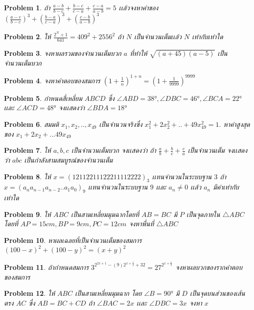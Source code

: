 \documentclass[a4paper,12pt]{article}
\newtheorem{problem}{Problem}
\begin{document}
	\begin{problem}
		ถ้า $\frac{a-b}{b-c}+\frac{b-c}{c-a}+\frac{c-a}{a-b} = 5$ เเล้วจงหาค่าของ $(\frac{a-c}{b-c})^3+(\frac{b-a}{c-a})^3+(\frac{c-b}{a-b})^3$
	\end{problem}
	\begin{problem}
		ให้ $\frac{2^N+1}{641} = 409^2 +2556^2$ ถ้า $N$ เป็นจำนวนเต็มเเล้ว $N$ เท่ากับเท่าใด
	\end{problem}
	\begin{problem}
		จงหาผลรวมของจำนวนเต็มบวก $a$ ที่ทำให้ $\sqrt{(a+45)(a-5)}$ เป็นจำนวนเต็มบวก
	\end{problem}
	\begin{problem}
		จงหาคำตอบของสมการ $(1+\frac{1}{n})^{1+n} = (1+\frac{1}{9999})^{9999}$
	\end{problem}
	\begin{problem}
		กำหนดสี่เหลี่ยม $ABCD$ ซึ่ง $\angle{ABD} = \ang{38}, \angle{DBC} = \ang{46}, \angle{BCA} = \ang{22}$ เเละ $\angle{ACD} = \ang{48}$ จงเเสดงว่า $\angle{BDA} = \ang{18}$ 
	\end{problem}
	\begin{problem}
		สมมติ $x_1,x_2,..,x_49$ เป็นจำนวนจริงซึ่ง $x_1^2+2x_2^2+..+49x_{49}^2 = 1.$ หาค่าสูงสุดของ $x_1+2x_2+...49x_{49}$
	\end{problem}
	\begin{problem}
		ให้ $a,b,c$ เป็นจำนวนเต็มบวก จงเเสดงว่า ถ้า $\frac{a}{b}+\frac{b}{c}+\frac{c}{a}$ เป็นจำนวนเต็ม จงเเสดงว่า $abc$ เป็นกำลังสามสมบูรณ์ของจำนวนเต็ม
	\end{problem}
	\begin{problem}
		ให้ $x = (12112211122211112222)_3$ เเทนจำนวนในระบบฐาน $3$ ถ้า $x = (a_na_{n-1}a_{n-2}..a_1a_0)_9$ เเทนจำนวนในระบบฐาน $9$ เเละ $a_n \neq 0$ เเล้ว $a_n$ มีค่าเท่ากับเท่าใด
	\end{problem}
	\begin{problem}
		ให้ $ABC$ เป็นสามเหลี่ยมมุมฉากโดยที่ $AB=BC$ มี $P$ เป็นจุดภายใน $\bigtriangleup{ABC}$ โดยที่ $AP = 15cm,BP = 9cm, PC = 12 cm$ จงหาพื่นที่ $\bigtriangleup{ABC}$
	\end{problem}
	\begin{problem}
		หาผลเฉลยที่เป็นจำนวนเต็มของสมการ $(100-x)^2+(100-y)^2 = (x+y)^2$
	\end{problem}
	\begin{problem}
		ถ้ากำหนดสมการ $3^{2^{2x+1}-(9)2^{x+\frac{1}{2}}+32} = 27^{2^{x+\frac{1}{2}}}$ จงหาผลบวกของรากคำตอบของสมการ
	\end{problem}
	\begin{problem} ให้ $ABC$ เป็นสามเหลี่ยมมุมฉาก โดย $\angle{B} = \ang{90}$ มี $D$ เป็นจุดบนส่วนของเส้นตรง $AC$ ซึ่ง $AB = BC + CD$ ถ้า $\angle{BAC} = 2x$ เเละ $\angle{DBC} = 3x$ จงหา $x$ 
	\end{problem}
\end{document}
